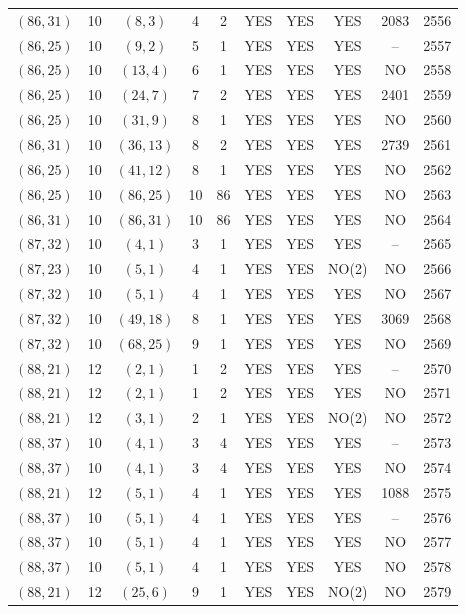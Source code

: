 \begin{longtable}{|c|c|c|c|c|c|c|c|c|c|}
$(86, 31)$ & 10 & $(8, 3)$ & 4 & 2 & YES & YES & YES & 2083 & 2556\\
$(86, 25)$ & 10 & $(9, 2)$ & 5 & 1 & YES & YES & YES & -- & 2557\\
$(86, 25)$ & 10 & $(13, 4)$ & 6 & 1 & YES & YES & YES & NO & 2558\\
$(86, 25)$ & 10 & $(24, 7)$ & 7 & 2 & YES & YES & YES & 2401 & 2559\\
$(86, 25)$ & 10 & $(31, 9)$ & 8 & 1 & YES & YES & YES & NO & 2560\\
$(86, 31)$ & 10 & $(36, 13)$ & 8 & 2 & YES & YES & YES & 2739 & 2561\\
$(86, 25)$ & 10 & $(41, 12)$ & 8 & 1 & YES & YES & YES & NO & 2562\\
$(86, 25)$ & 10 & $(86, 25)$ & 10 & 86 & YES & YES & YES & NO & 2563\\
$(86, 31)$ & 10 & $(86, 31)$ & 10 & 86 & YES & YES & YES & NO & 2564\\
$(87, 32)$ & 10 & $(4, 1)$ & 3 & 1 & YES & YES & YES & -- & 2565\\
$(87, 23)$ & 10 & $(5, 1)$ & 4 & 1 & YES & YES & NO(2) & NO & 2566\\
$(87, 32)$ & 10 & $(5, 1)$ & 4 & 1 & YES & YES & YES & NO & 2567\\
$(87, 32)$ & 10 & $(49, 18)$ & 8 & 1 & YES & YES & YES & 3069 & 2568\\
$(87, 32)$ & 10 & $(68, 25)$ & 9 & 1 & YES & YES & YES & NO & 2569\\
$(88, 21)$ & 12 & $(2, 1)$ & 1 & 2 & YES & YES & YES & -- & 2570\\
$(88, 21)$ & 12 & $(2, 1)$ & 1 & 2 & YES & YES & YES & NO & 2571\\
$(88, 21)$ & 12 & $(3, 1)$ & 2 & 1 & YES & YES & NO(2) & NO & 2572\\
$(88, 37)$ & 10 & $(4, 1)$ & 3 & 4 & YES & YES & YES & -- & 2573\\
$(88, 37)$ & 10 & $(4, 1)$ & 3 & 4 & YES & YES & YES & NO & 2574\\
$(88, 21)$ & 12 & $(5, 1)$ & 4 & 1 & YES & YES & YES & 1088 & 2575\\
$(88, 37)$ & 10 & $(5, 1)$ & 4 & 1 & YES & YES & YES & -- & 2576\\
$(88, 37)$ & 10 & $(5, 1)$ & 4 & 1 & YES & YES & YES & NO & 2577\\
$(88, 37)$ & 10 & $(5, 1)$ & 4 & 1 & YES & YES & YES & NO & 2578\\
$(88, 21)$ & 12 & $(25, 6)$ & 9 & 1 & YES & YES & NO(2) & NO & 2579\\

\end{longtable}
